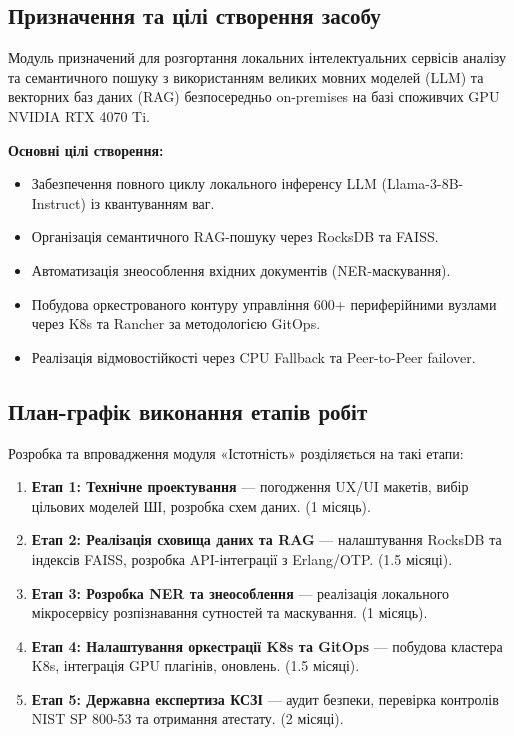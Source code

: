 \documentclass{article}
\begin{document}
\subsection{Призначення та цілі створення засобу}
Модуль призначений для розгортання локальних інтелектуальних сервісів аналізу та семантичного пошуку з використанням великих мовних моделей (LLM) та векторних баз даних (RAG) безпосередньо on-premises на базі споживчих GPU NVIDIA RTX 4070 Ti.

\textbf{Основні цілі створення:}
\begin{itemize}
    \item Забезпечення повного циклу локального інференсу LLM (Llama-3-8B-Instruct) із квантуванням ваг.
    \item Організація семантичного RAG-пошуку через RocksDB та FAISS.
    \item Автоматизація знеособлення вхідних документів (NER-маскування).
    \item Побудова оркестрованого контуру управління 600+ периферійними вузлами через K8s та Rancher за методологією GitOps.
    \item Реалізація відмовостійкості через CPU Fallback та Peer-to-Peer failover.
\end{itemize}

\subsection{План-графік виконання етапів робіт}
Розробка та впровадження модуля «Істотність» розділяється на такі етапи:
\begin{enumerate}
    \item \textbf{Етап 1: Технічне проектування} --- погодження UX/UI макетів, вибір цільових моделей ШІ, розробка схем даних. (1 місяць).
    \item \textbf{Етап 2: Реалізація сховища даних та RAG} --- налаштування RocksDB та індексів FAISS, розробка API-інтеграції з Erlang/OTP. (1.5 місяці).
    \item \textbf{Етап 3: Розробка NER та знеособлення} --- реалізація локального мікросервісу розпізнавання сутностей та маскування. (1 місяць).
    \item \textbf{Етап 4: Налаштування оркестрації K8s та GitOps} --- побудова кластера K8s, інтеграція GPU плагінів, оновлень. (1.5 місяці).
    \item \textbf{Етап 5: Державна експертиза КСЗІ} --- аудит безпеки, перевірка контролів NIST SP 800-53 та отримання атестату. (2 місяці).
\end{enumerate}
\end{document}
